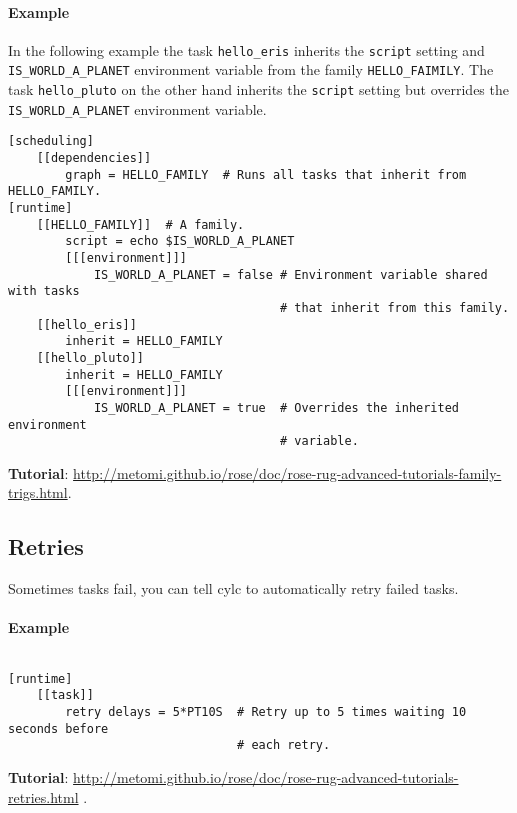 \paragraph*{Example}
In the following example the
task \lstinline{hello_eris} inherits the \lstinline{script} setting and
\lstinline{IS_WORLD_A_PLANET} environment variable from the family
\lstinline{HELLO_FAIMILY}. The task \lstinline{hello_pluto} on the other hand
inherits the \lstinline{script} setting but overrides the
\lstinline{IS_WORLD_A_PLANET} environment variable.

\begin{lstlisting}
[scheduling]
    [[dependencies]]
        graph = HELLO_FAMILY  # Runs all tasks that inherit from HELLO_FAMILY.
[runtime]
    [[HELLO_FAMILY]]  # A family.
        script = echo $IS_WORLD_A_PLANET
        [[[environment]]]
            IS_WORLD_A_PLANET = false # Environment variable shared with tasks
                                      # that inherit from this family.
    [[hello_eris]]
        inherit = HELLO_FAMILY
    [[hello_pluto]]
        inherit = HELLO_FAMILY
        [[[environment]]]
            IS_WORLD_A_PLANET = true  # Overrides the inherited environment
                                      # variable.
\end{lstlisting}

\begin{shaded*}
\textbf{Tutorial}: \url{http://metomi.github.io/rose/doc/rose-rug-advanced-tutorials-family-trigs.html}.
\end{shaded*}


\subsection{Retries}
Sometimes tasks fail, you can tell cylc to automatically retry failed tasks.

\paragraph*{Example} $ $

\begin{lstlisting}
[runtime]
    [[task]]
        retry delays = 5*PT10S  # Retry up to 5 times waiting 10 seconds before
                                # each retry.
\end{lstlisting}

\begin{shaded*}
\textbf{Tutorial}: \url{http://metomi.github.io/rose/doc/rose-rug-advanced-tutorials-retries.html}
.
\end{shaded*}


